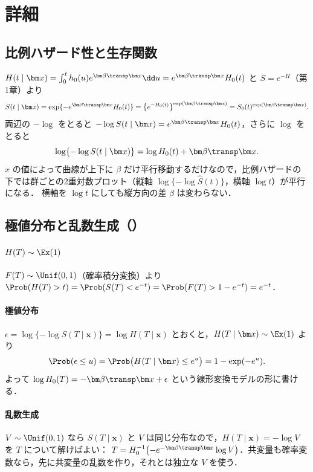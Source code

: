 \section{詳細}\label{sec:m03-shosai}
\subsection{比例ハザード性と生存関数}
$H(t\mid\bm x)=\int_0^th_0(u)e^{\bm\beta\transp\bm x}\dd u=e^{\bm\beta\transp\bm x}H_0(t)$ と $S=e^{-H}$（第1章）より
\[
S(t\mid\bm x)=\exp\{-e^{\bm\beta\transp\bm x}H_0(t)\}=\bigl\{e^{-H_0(t)}\bigr\}^{\exp(\bm\beta\transp\bm x)}=S_0(t)^{\exp(\bm\beta\transp\bm x)} .
\]
両辺の $-\log$ をとると $-\log S(t\mid\bm x)=e^{\bm\beta\transp\bm x}H_0(t)$，さらに $\log$ をとると
\[
\log\{-\log S(t\mid\bm x)\}=\log H_0(t)+\bm\beta\transp\bm x .
\]
$x$ の値によって曲線が上下に $\beta$ だけ平行移動するだけなので，比例ハザードの下では群ごとの2重対数プロット（縦軸 $\log\{-\log\hat S(t)\}$，横軸 $\log t$）が平行になる．
横軸を $\log t$ にしても縦方向の差 $\beta$ は変わらない．

\subsection{極値分布と乱数生成（）}
\paragraph{$H(T)\sim\Ex(1)$}
$F(T)\sim\Unif(0,1)$（確率積分変換）より $\Prob(H(T)>t)=\Prob(S(T)<e^{-t})=\Prob(F(T)>1-e^{-t})=e^{-t}$．
\paragraph{極値分布}
$\epsilon=\log\{-\log S(T\mid\bm x)\}=\log H(T\mid\bm x)$ とおくと，$H(T\mid\bm x)\sim\Ex(1)$ より
\[
\Prob(\epsilon\le u)=\Prob\bigl(H(T\mid\bm x)\le e^u\bigr)=1-\exp(-e^u).
\]
よって $\log H_0(T)=-\bm\beta\transp\bm x+\epsilon$ という線形変換モデルの形に書ける．
\paragraph{乱数生成}
$V\sim\Unif(0,1)$ なら $S(T\mid\bm x)$ と $V$ は同じ分布なので，$H(T\mid\bm x)=-\log V$ を $T$ について解けばよい：
$T=H_0^{-1}\bigl(-e^{-\bm\beta\transp\bm x}\log V\bigr)$．共変量も確率変数なら，先に共変量の乱数を作り，それとは独立な $V$ を使う．

